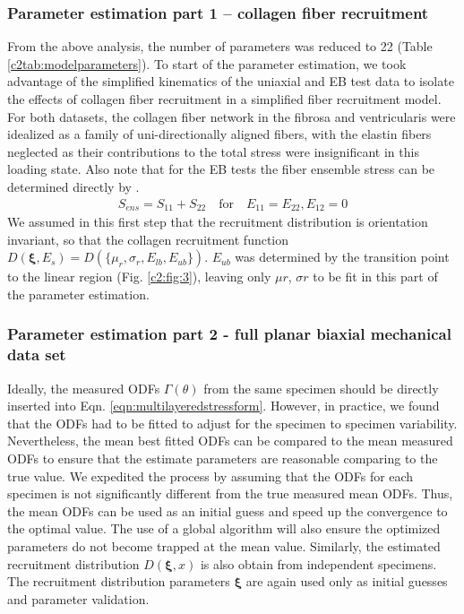 \subsubsection{Parameter estimation part 1 – collagen fiber recruitment} \label{c2:sec:2254}

    From the above analysis, the number of parameters was reduced to 22 (Table \ref{c2tab:modelparameters}). To start of the parameter estimation, we took advantage of the simplified kinematics of the uniaxial and EB test data to isolate the effects of collagen fiber recruitment in a simplified fiber recruitment model. For both datasets, the collagen fiber network in the fibrosa and ventricularis were idealized as a family of uni-directionally aligned fibers, with the elastin fibers neglected as their contributions to the total stress were insignificant in this loading state. Also note that for the EB tests the fiber ensemble stress can be determined directly by \cite{sacks_biaxial_2000}.
        \begin{equation}\label{c2eqn:ensembleform}
        \begin{aligned}
        S_{ens} = S_{11} + S_{22} \quad \text{for} \quad E_{11} = E_{22}, E_{12} = 0
        \end{aligned}
        \end{equation}
    We assumed in this first step that the recruitment distribution is orientation invariant, so that the collagen recruitment function $D(\mathbf{\xi},E_s) = D(\{\mu_r, \sigma_r, E_{lb}, E_{ub}\})$. $E_{ub}$ was determined by the transition point to the linear region (Fig. \ref{c2:fig:3}), leaving only $\mu r$, $\sigma r$ to be fit in this part of the parameter estimation. 
    
    
\subsubsection{Parameter estimation part 2 - full planar biaxial mechanical data set}

    Ideally, the measured ODFs $\Gamma(\theta)$ from the same specimen should be directly inserted into Eqn. \ref{eqn:multilayeredstressform}. However, in practice, we found that the ODFs had to be fitted to adjust for the specimen to specimen variability. Nevertheless, the mean best fitted ODFs can be compared to the mean measured ODFs to ensure that the estimate parameters are reasonable comparing to the true value. We expedited the process by assuming that the ODFs for each specimen is not significantly different from the true measured mean ODFs. Thus, the mean ODFs can be used as an initial guess and speed up the convergence to the optimal value. The use of a global algorithm will also ensure the optimized parameters do not become trapped at the mean value. Similarly, the estimated recruitment distribution $D(\mathbf{\xi}, x)$ is also obtain from independent specimens. The recruitment distribution parameters $\mathbf{\xi}$ are again used only as initial guesses and parameter validation.
    

